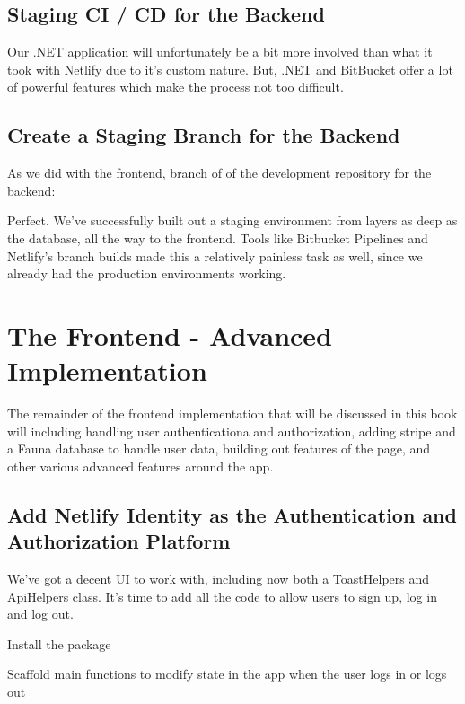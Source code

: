 \documentclass[paper=6in:9in,pagesize=pdftex,headinclude=on,footinclude=on,12pt,twoside]{scrbook}
\begin{document}
\section{Staging CI / CD for the Backend}

Our .NET application will unfortunately be a bit more involved than what it took with Netlify due to it's custom nature. But, .NET and BitBucket offer a lot of powerful features which make the process not too difficult.

\section{Create a Staging Branch for the Backend}

As we did with the frontend, branch of of the development repository for the backend:


Perfect. We've successfully built out a staging environment from layers as deep as the database, all the way to the frontend. Tools like Bitbucket Pipelines and Netlify's branch builds made this a relatively painless task as well, since we already had the production environments working.

\chapter{The Frontend - Advanced Implementation}

The remainder of the frontend implementation that will be discussed in this book will including handling user authenticationa and authorization, adding stripe and a Fauna database to handle user data, building out features of the  page, and other various advanced features around the app.

\section{Add Netlify Identity as the Authentication and Authorization Platform}

We've got a decent UI to work with, including now both a ToastHelpers and ApiHelpers class. It's time to add all the code to allow users to sign up, log in and log out. 

\begin{arrows}
\item Install the  package
\item Scaffold main functions to modify state in the app when the user logs in or logs out
\end{arrows}
\end{document}
